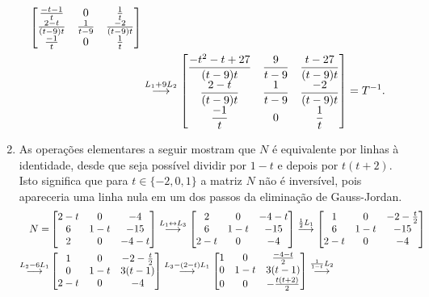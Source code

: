 \documentclass[12pt,a4paper]{article}
\newcommand{\grstep}[2][\relax]{%
   \ensuremath{\mathrel{
       {\mathop{\longrightarrow}\limits^{#2\mathstrut}_{
                                     \begin{subarray}{l} #1 \end{subarray}}}}}}
\newcommand{\swap}{\leftrightarrow}
\begin{document}
\begin{enumerate}
\begin{align*}
\begin{bmatrix}
\frac{-t-1}{t} & 0 & \frac{1}{t} \\
\frac{2-t}{(t-9)t} & \frac{1}{t-9} & \frac{-2}{(t-9)t} \\
\frac{-1}{t} & 0 & \frac{1}{t}
\end{bmatrix}\\
&\grstep{ L_1 + 9L_2 }
\begin{bmatrix}
\dfrac{-t^2 - t + 27}{(t-9)t} & \dfrac{9}{t-9} & \dfrac{t-27}{(t-9)t}\\
\dfrac{2-t}{(t-9)t} & \dfrac{1}{t-9} & \dfrac{-2}{(t-9)t}\\
\dfrac{-1}{t} & 0 & \dfrac{1}{t}
\end{bmatrix} = T^{-1}.
\end{align*}


\item As operações elementares a seguir mostram que $N$ é equivalente por linhas à identidade, desde que seja possível dividir por $1-t$ e depois por $t(t+2)$. Isto significa que para $t \in\{ -2, 0, 1 \}$ a matriz $N$ não é inversível, pois apareceria uma linha nula em um dos passos da eliminação de Gauss-Jordan.
\begin{align*}
N= & \begin{bmatrix}
2-t & 0 & -4 \\
6 & 1-t & -15 \\
2 & 0 & -4-t
\end{bmatrix}
\grstep{ L_1 \swap L_3 }
\begin{bmatrix}
2 & 0 & -4-t \\
6 & 1-t & -15 \\
2-t & 0 & -4
\end{bmatrix}
\grstep{ \frac{1}{2} L_1 }
\begin{bmatrix}
1 & 0 & -2-\frac{t}{2} \\
6 & 1-t & -15 \\
2-t & 0 & -4
\end{bmatrix} \\
\grstep{ L_2 - 6 L_1 }
& \begin{bmatrix}
1 & 0 & -2-\frac{t}{2} \\
0 & 1-t & 3(t-1) \\
2-t & 0 & -4
\end{bmatrix}
\grstep{ L_3 - (2-t) L_1 }
\begin{bmatrix}
1 & 0 & \frac{-4-t}{2} \\
0 & 1-t & 3(t-1) \\
0 & 0 & -\frac{t(t+2)}{2}
\end{bmatrix}
\grstep{ \frac{1}{1-t} L_2 }

\end{align*}
\end{enumerate}
\end{document}
